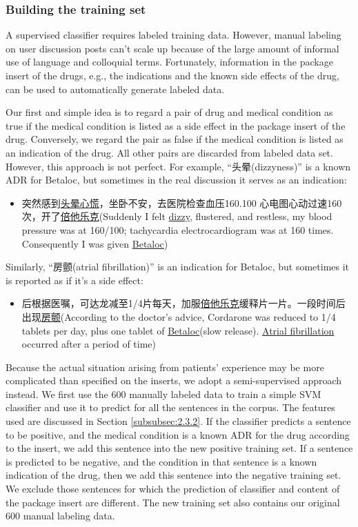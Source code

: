 \subsubsection{Building the training set}
\label{subsubsec:2.3.1} 
A supervised classifier requires labeled training data. However, manual labeling on user discussion posts can’t scale up because of the large amount of informal use of language and colloquial terms. Fortunately, information in the package insert of the drugs, e.g., the indications and the known side effects of the drug, can be used to automatically generate labeled data. 

Our first and simple idea is to regard a pair of drug and medical condition as true if the medical condition is listed as a side effect in the package insert of the drug. Conversely, we regard the pair as false if the medical condition is listed as an indication of the drug. All other pairs are discarded from labeled data set. However, this approach is not perfect. For example, “头晕(dizzyness)” is a known ADR for Betaloc, but sometimes in the real discussion it serves as an indication:

\begin{itemize}
	\item 突然感到\uline{头晕心慌}，坐卧不安，去医院检查血压160.100 心电图心动过速160次，开了\uline{倍他乐克}(Suddenly I felt \uline{dizzy}, flustered, and restless, my blood pressure was at 160/100; tachycardia electrocardiogram was at 160 times. Consequently I was given \uline{Betaloc})
\end{itemize}

Similarly, “房颤(atrial fibrillation)” is an indication for Betaloc, but sometimes it is reported as if it’s a side effect:

\begin{itemize}
	\item 后根据医嘱，可达龙减至1/4片每天，加服\uline{倍他乐克}缓释片一片。一段时间后出现\uline{房颤}(According to the doctor’s advice, Cordarone was reduced to 1/4 tablets per day, plus one tablet of \uline{Betaloc}(slow release). \uline{Atrial fibrillation} occurred after a period of time)
\end{itemize}

Because the actual situation arising from patients’ experience may be more complicated than specified on the inserts, we adopt a semi-supervised approach instead. We first use the 
600 manually labeled data to train a simple SVM classifier and use it to predict for all 
the sentences in the corpus. The features used are discussed in 
Section \ref{subsubsec:2.3.2}. If the classifier predicts a sentence to be positive, 
and the medical condition is a known ADR for the drug according to the insert, 
we add this sentence into the new positive training set. If a sentence is predicted to be negative, and the condition in that sentence is a known indication of the drug, then we add this sentence into the negative training set. We exclude those sentences for which the 
prediction of classifier and content of the package insert are different. 
The new training set also contains our original 600 manual labeling data.

